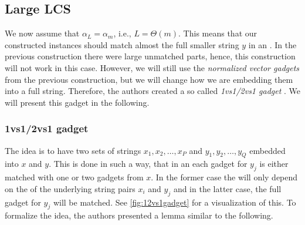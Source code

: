 \subsection{Large LCS}

We now assume that $\alpha_L = \alpha_m$, i.e., $L = \Theta(m)$.
This means that our constructed instances should match almost the full smaller string $y$ in an \lcs{}.
In the previous construction there were large unmatched parts, hence, this construction will not work in this case.
However, we will still use the \emph{normalized vector gadgets} from the previous construction, but we will change how we are embedding them into a full string.
Therefore, the authors created a so called \emph{1vs1/2vs1 gadget} \cite[section 9.2.1]{Bringman.2018}.
We will present this gadget in the following.

\subsubsection{1vs1/2vs1 gadget}
The idea is to have two sets of strings $x_1, x_2, \ldots, x_P$ and $y_1, y_2, \ldots, y_Q$ embedded into $x$ and $y$.
This is done in such a way, that in an \lcs{} each gadget for $y_j$ is either matched with one or two gadgets from $x$.
In the former case the \lcs{} will only depend on the \lcs{} of the underlying string pairs $x_i$ and $y_j$ and in the latter case, the full gadget for $y_j$ will be matched.
See \autoref{fig:12vs1gadget} for a visualization of this.
To formalize the idea, the authors presented a lemma \cite[Lemma 9.6]{Bringman.2018} similar to the following. 






